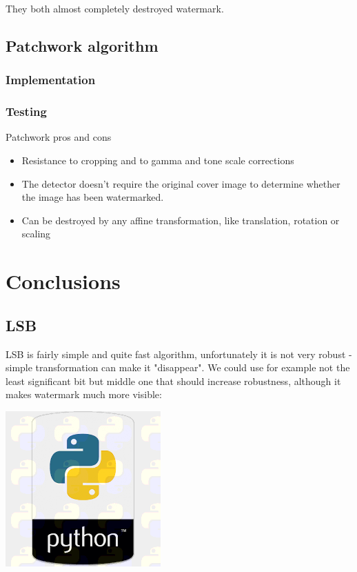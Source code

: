 \documentclass[a4paper, 12pt]{article}
\begin{document}
    	They both almost completely destroyed watermark.

	\subsection{Patchwork algorithm}
	
	\subsubsection{Implementation}
	
	
	
	\subsubsection{Testing}

	Patchwork pros and cons

	\begin{itemize}
		\item Resistance to cropping and to gamma and tone scale corrections
		\item The detector doesn’t require the original cover image to determine whether the image has been watermarked.
		\item Can be destroyed by any affine transformation, like translation, rotation or scaling
	\end{itemize}

\section{Conclusions}

	\subsection{LSB}

	LSB is fairly simple and quite fast algorithm, unfortunately it is not very robust - simple transformation can make it "disappear". We could use for example not the least significant bit but middle one that should increase robustness, although it makes watermark much more visible:


	\includegraphics[scale=1.0]{python_lsb/watermarked_python_4bit.png}
\end{document}
